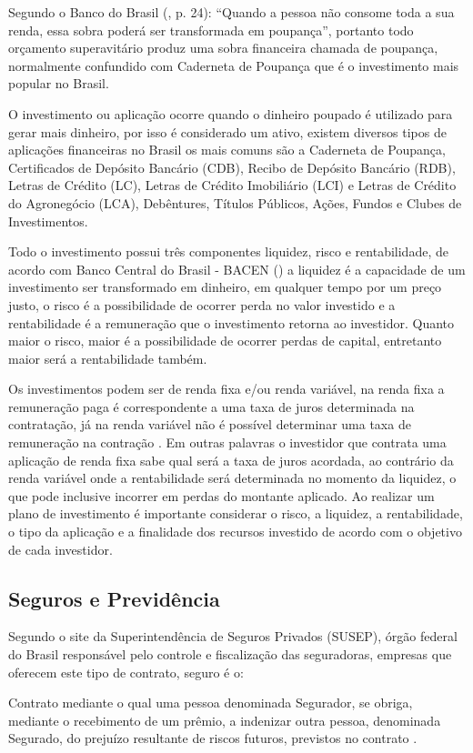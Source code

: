 Segundo o Banco do Brasil (\citeyear{bb2012}, p. 24): “Quando a pessoa não consome toda a sua renda, essa sobra poderá ser transformada em poupança”, portanto todo orçamento superavitário produz uma sobra financeira chamada de poupança, normalmente confundido com Caderneta de Poupança que é o investimento mais popular no Brasil.

O investimento ou aplicação ocorre quando o dinheiro poupado é utilizado para gerar mais dinheiro, por isso é considerado um ativo, existem diversos tipos de aplicações financeiras no Brasil os mais comuns são a Caderneta de Poupança, Certificados de Depósito Bancário (CDB), Recibo de Depósito Bancário (RDB), Letras de Crédito (LC), Letras de Crédito Imobiliário (LCI) e Letras de Crédito do Agronegócio (LCA), Debêntures, Títulos Públicos, Ações, Fundos e Clubes de Investimentos.

Todo o investimento possui três componentes liquidez, risco e rentabilidade, de acordo com Banco Central do Brasil - BACEN (\citeyear{bacen2013}) a liquidez é a capacidade de um investimento ser transformado em dinheiro, em qualquer tempo por um preço justo, o risco é a possibilidade de ocorrer perda no valor investido e a rentabilidade é a remuneração que o investimento retorna ao investidor. Quanto maior o risco, maior é a possibilidade de ocorrer perdas de capital, entretanto maior será a rentabilidade também.

Os investimentos podem ser de renda fixa e/ou renda variável, na renda fixa a remuneração paga é correspondente a uma taxa de juros determinada na contratação, já na renda variável não é possível determinar uma taxa de remuneração na contração \cite{bacen2013}. Em outras palavras o investidor que contrata uma aplicação de renda fixa sabe qual será a taxa de juros acordada, ao contrário da renda variável onde a rentabilidade será determinada no momento da liquidez, o que pode inclusive incorrer em perdas do montante aplicado. Ao realizar um plano de investimento é importante considerar o risco, a liquidez, a rentabilidade, o tipo da aplicação e a finalidade dos recursos investido de acordo com o objetivo de cada investidor.

\subsection{Seguros e Previdência}
Segundo o site da Superintendência de Seguros Privados (SUSEP), órgão federal do Brasil responsável pelo controle e fiscalização das seguradoras, empresas que oferecem este tipo de contrato, seguro é o:
\begin{citacao}
Contrato mediante o qual uma pessoa denominada Segurador, se obriga, mediante o recebimento de um prêmio, a indenizar outra pessoa, denominada Segurado, do prejuízo resultante de riscos futuros, previstos no contrato \cite{susep2007}.
\end{citacao}

